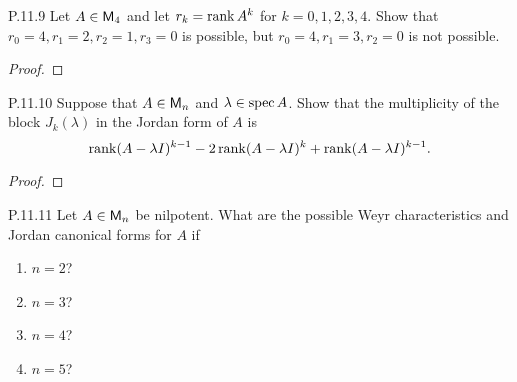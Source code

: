 \documentclass{../homework}
\begin{document}
\begin{problems}
\item[P.11.9] Let \(A \in \mathsf{M}_4\) and let \(r_k = \operatorname{rank} A^k\) for
  \(k = 0, 1, 2, 3, 4\).  Show that
  \(r_0 = 4, r_1 = 2, r_2 = 1, r_3 = 0\) is possible, but
  \(r_0 = 4, r_1 = 3, r_2 = 0\) is not possible.

  \begin{solution}
    \begin{proof}

    \end{proof}
  \end{solution}

\item[P.11.10] Suppose that \(A \in \mathsf{M}_n\) and
  \(\lambda \in \operatorname{spec} A\).  Show that the multiplicity of the block
  \(J_k(\lambda)\) in the Jordan form of \(A\) is
  \[
    \operatorname{rank}(A-\lambda I)^{k-1}
    - 2 \operatorname{rank}(A-\lambda I)^k
    + \operatorname{rank}(A-\lambda I)^{k-1}.
  \]

  \begin{solution}
    \begin{proof}

    \end{proof}
  \end{solution}

\item[P.11.11] Let \(A \in \mathsf{M}_n\) be nilpotent.  What are the possible
  Weyr characteristics and Jordan canonical forms for \(A\) if
  \begin{enumerate}
  \item \(n=2\)?

    \begin{solution}

    \end{solution}

  \item \(n=3\)?

    \begin{solution}

    \end{solution}

  \item \(n=4\)?

    \begin{solution}

    \end{solution}

  \item \(n=5\)?

    \begin{solution}

    \end{solution}
  \end{enumerate}


\end{problems}
\end{document}

